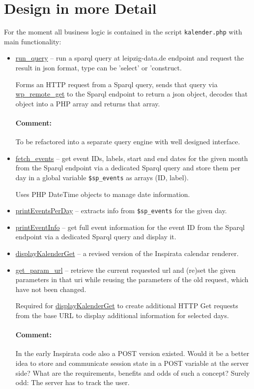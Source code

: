 \documentclass[11pt,a4paper]{article}
\newcommand{\comment}[1]{\par\paragraph{Comment:} #1}
\begin{document}
\section{Design in more Detail}

For the moment all business logic is contained in the script
\texttt{kalender.php} with main functionality:
\begin{itemize}
\item \url{run_query} -- run a sparql query at leipzig-data.de endpoint
  and request the result in json format, type can be 'select' or 'construct.

  Forms an HTTP request from a Sparql query, sends that query via
  \url{wp_remote_get} to the Sparql endpoint to return a json object, decodes
  that object into a PHP array and returns that array.

  \comment{To be refactored into a separate query engine with well designed
    interface.} 

\item \url{fetch_events} -- get event IDs, labels, start and end dates for the
  given month from the Sparql endpoint via a dedicated Sparql query and store
  them per day in a global variable \texttt{\$sp\_events} as arrays (ID,
  label).

  Uses PHP DateTime objects to manage date information. 

\item \url{printEventsPerDay} -- extracts info from \texttt{\$sp\_events} for
  the given day.

\item \url{printEventInfo} -- get full event information for the event ID from
  the Sparql endpoint via a dedicated Sparql query and display it.

\item \url{displayKalenderGet} -- a revised version of the Inspirata calendar
  renderer. 

\item \url{get_param_url} -- retrieve the current requested url and (re)set
  the given parameters in that uri while reusing the parameters of the old
  request, which have not been changed.

  Required for \url{displayKalenderGet} to create additional HTTP Get requests
  from the base URL to display additional information for selected days. 

  \comment{In the early Inspirata code also a POST version existed.  Would it
    be a better idea to store and communicate session state in a POST variable
    at the server side? What are the requirements, benefits and odds of such a
    concept?  Surely odd: The server has to track the user.}

\end{itemize}
\end{document}
